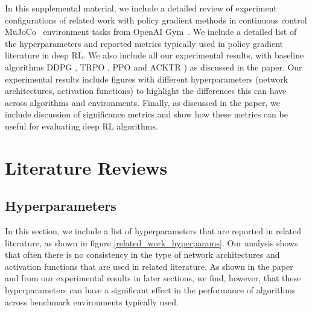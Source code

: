 
In this supplemental material, we include a detailed review of experiment configurations of related work with policy gradient methods in continuous control MuJoCo~\cite{MuJoCo} environment tasks from OpenAI Gym~\cite{gym}. We include a detailed list of the hyperparameters and reported metrics typically used in policy gradient literature in deep RL. We also include all our experimental results, with baseline algorithms DDPG \cite{DDPG}, TRPO \cite{TRPO}, PPO \cite{PPO} and ACKTR \cite{ACKTR}) as discussed in the paper. Our experimental results include figures with different hyperparameters (network architectures, activation functions) to highlight the differences this can have across algorithms and environments.  Finally, as discussed in the paper, we include discussion of significance metrics and show how these metrics can be useful for evaluating deep RL algorithms.


\section{Literature Reviews}

\subsection{Hyperparameters}

In this section, we include a list of hyperparameters that are reported in related literature, as shown in figure \ref{related_work_hyperparams}.  Our analysis shows that often there is no consistency in the type of network architectures and activation functions that are used in related literature. As shown in the paper and from our experimental results in later sections, we find, however, that these hyperparameters can have a significant effect in the performance of algorithms across benchmark environments typically used.

